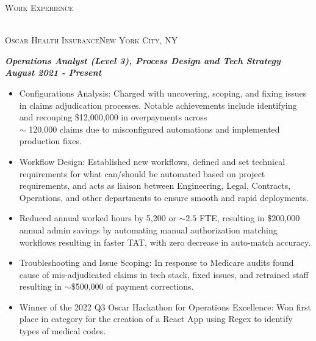 \documentclass[a4paper]{article}
\newcommand{\lineunder} {
    \vspace*{-8pt} \\
    \hspace*{-18pt} \hrulefill \\
}
\newcommand{\header} [1] {
    {\hspace*{-18pt}\vspace*{6pt} \textsc{#1}}
    \vspace*{-6pt} \lineunder
}
\newcommand{\jobtitle} [1] {
    {\hspace*{-18pt} \textsc{#1}}
    
}
\begin{document}
\header{Work Experience}
\vspace{1mm}
\jobtitle{Oscar Health Insurance\hfill New York City, NY}
\hspace*{-16pt}\textit{\textbf{Operations Analyst (Level 3), Process Design and Tech Strategy}} \hfill \textit{\textbf{August 2021 - Present}}\\
\vspace{-1mm}
\begin{itemize}[leftmargin=10pt,align=left]
    \item Configurations Analysis: Charged with uncovering, scoping, and fixing issues in claims adjudication processes. 
        Notable achievements include identifying and recouping \$12,000,000 in overpayments across\\
        $\sim$ 120,000 claims due to misconfigured automations and implemented production fixes.

    \item   Workflow Design: Established new workflows, defined and set technical requirements for what can/should be automated based on project requirements,
     and acts as liaison between Engineering, Legal, Contracts, Operations, and other departments to ensure smooth and rapid deployments.
     \item Reduced annual worked hours by 5,200 or $\sim2.5$ FTE, resulting in \$200,000 annual admin savings by automating manual authorization matching workflows resulting in faster TAT, with zero decrease in auto-match accuracy.
     \item 	Troubleshooting and Issue Scoping: In response to Medicare audits found cause of mis-adjudicated claims in tech stack, fixed issues, and retrained staff
     resulting in $\sim \$$500,000 of payment corrections.

     \item Winner of the 2022 Q3 Oscar Hackathon for Operations Excellence: Won first place in category for the creation of a React App using Regex to identify types of medical codes.
\end{itemize}
\end{document}
